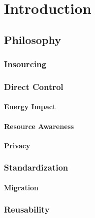\chapter{Introduction}
\label{cha:introduction}

\section{Philosophy}
\label{sec:introduction_philosophy}

\subsection{Insourcing}
\label{subsec:introduction_philosophy_insourcing}

\subsection{Direct Control}
\label{subsec:introduction_philosophy_direct_control}

\subsubsection{Energy Impact}
\label{subsubsec:introduction_philosophy_direct_control_energy_impact}

\subsubsection{Resource Awareness}
\label{subsubsec:introduction_philosophy_direct_control_resource_awareness}

\subsubsection{Privacy}
\label{subsubsec:introduction_philosophy_direct_control_privacy}

\subsection{Standardization}
\label{subsec:introduction_philosophy_standardization}

\subsubsection{Migration}
\label{subsubsec:introduction_philosophy_standardization_migration}

\subsection{Reusability}
\label{subsec:introduction_philosophy_reusability}

